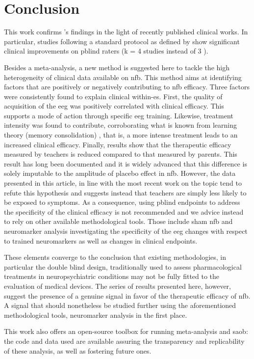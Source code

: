 

\section{Conclusion}

This work confirms \citet{Cortese2016}'s findings in the light of recently published clinical works.
In particular, studies following a standard protocol as defined by \citet{Arns2014} show significant 
clinical improvements on \gls{pblind} raters (k = 4 studies instead of 3 \citet{Cortese2016}).

Besides a meta-analysis, a new method is suggested here to tackle the high heterogeneity of clinical data 
available on \gls{nfb}. This method aims at identifying factors that are positively or negatively contributing 
to \gls{nfb} efficacy. Three factors were consistently found to explain clinical 
within-\gls{es}. First, the quality of acquisition of the \gls{eeg} was positively correlated with clinical 
efficacy. This supports a mode of action through specific \gls{eeg} training. Likewise, treatment intensity was 
found to contribute, corroborating what is known from learning theory (memory consolidation) \citep{Mowrer1960}, 
that is, a more intense treatment leads to an increased clinical efficacy. Finally, results show that the therapeutic 
efficacy measured by teachers is reduced compared to that measured by parents. This result has long been documented 
and it is widely advanced that this difference is solely imputable to the amplitude of placebo effect in \gls{nfb}. 
However, the data presented in this article, in line with the most recent work on the topic \citep{Sollie2013, Narad2015, Minder2018} 
tend to refute this hypothesis and suggests instead that teachers are simply less likely to be exposed to symptoms. 
As a consequence, using \gls{pblind} endpoints to address the specificity of the clinical efficacy is not recommended 
and we advice instead to rely on other available methodological tools. Those include sham \gls{nfb} and neuromarker 
analysis investigating the specificity of the \gls{eeg} changes with respect to trained neuromarkers as well as changes 
in clinical endpoints.

These elements converge to the conclusion that existing methodologies, in particular the double blind design, 
traditionally used to assess pharmacological treatments 
in neuropsychiatric conditions may not be fully fitted to the evaluation of medical devices. The series of results presented 
here, however, suggest the presence of a genuine signal in favor of the therapeutic efficacy of \gls{nfb}. A signal that 
should nonetheless be studied further using the aforementioned methodological tools, neuromarker analysis in the first place.

This work also offers an open-source toolbox for running meta-analysis and \gls{saob}: the code and data used are available 
assuring the transparency and replicability of these analysis, as well as fostering future ones. 

